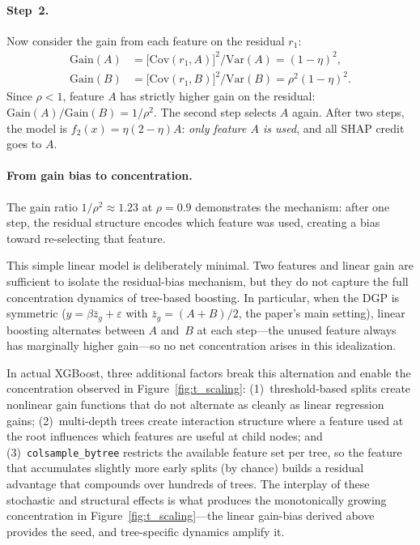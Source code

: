\documentclass[11pt]{article}
\newcommand{\rhovar}{\rho}
\begin{document}
\paragraph{Step~2.}
Now consider the gain from each feature on the residual $r_1$:
\begin{align}
  \text{Gain}(A) &= \bigl[\text{Cov}(r_1, A)\bigr]^2 / \text{Var}(A) = (1 - \eta)^2, \\
  \text{Gain}(B) &= \bigl[\text{Cov}(r_1, B)\bigr]^2 / \text{Var}(B) = \rho^2(1 - \eta)^2.
\end{align}
Since $\rho < 1$, feature $A$ has strictly higher gain on the residual:
$\text{Gain}(A) / \text{Gain}(B) = 1/\rho^2$.  The second step selects
$A$ again.  After two steps, the model is $f_2(x) = \eta(2 - \eta) A$:
\emph{only feature $A$ is used}, and all SHAP credit goes to $A$.

\paragraph{From gain bias to concentration.}
The gain ratio $1/\rho^2 \approx 1.23$ at $\rhovar = 0.9$ demonstrates
the mechanism: after one step, the residual structure encodes which
feature was used, creating a bias toward re-selecting that feature.

This simple linear model is deliberately minimal.  Two features and
linear gain are sufficient to isolate the residual-bias mechanism, but
they do not capture the full concentration dynamics of tree-based
boosting.  In particular, when the DGP is symmetric
($y = \beta \bar{z}_g + \varepsilon$ with $\bar{z}_g = (A + B)/2$,
the paper's main setting), linear boosting alternates between $A$
and~$B$ at each step---the unused feature always has marginally higher
gain---so no net concentration arises in this idealization.

In actual XGBoost, three additional factors break this alternation and
enable the concentration observed in Figure~\ref{fig:t_scaling}:
(1)~threshold-based splits create nonlinear gain functions that do not
alternate as cleanly as linear regression gains;
(2)~multi-depth trees create interaction structure where a feature used
at the root influences which features are useful at child nodes; and
(3)~\texttt{colsample\_bytree} restricts the available feature set per
tree, so the feature that accumulates slightly more early splits
(by chance) builds a residual advantage that compounds over hundreds
of trees.  The interplay of these stochastic and structural effects is
what produces the monotonically growing concentration in
Figure~\ref{fig:t_scaling}---the linear gain-bias derived above provides
the seed, and tree-specific dynamics amplify it.
\end{document}

